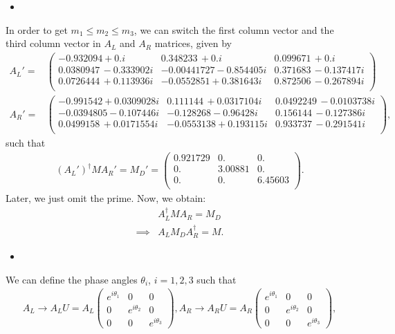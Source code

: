 \begin{itemize}
    \item [(b)]
\end{itemize}
In order to get $m_1\leq m_2\leq m_3$, we can switch the first column vector and the third column vector in $A_L$ and $A_R$ matrices, given by 
\begin{align}
    A_L'=&\begin{pmatrix}
         -0.932094+0. i & 0.348233\, +0. i & 0.099671\, +0. i \\
 0.0380947\, -0.333902 i & -0.00441727-0.854405 i & 0.371683\, -0.137417 i \\
 0.0726444\, +0.113936 i & -0.0552851+0.381643 i & 0.872506\, -0.267894 i \\
    \end{pmatrix}\\
A_R'=&\begin{pmatrix}
     -0.991542+0.0309028 i & 0.111144\, +0.0317104 i & 0.0492249\, -0.0103738 i \\
 -0.0394805-0.107446 i & -0.128268-0.96428 i & 0.156144\, -0.127386 i \\
 0.0499158\, +0.0171554 i & -0.0553138+0.193115 i & 0.933737\, -0.291541 i \\
\end{pmatrix},
\end{align}
such that 
\begin{align}
    (A_L')^\dagger M A_R' =  M_D'=\begin{pmatrix}
        0.921729 & 0. & 0. \\
        0. & 3.00881 & 0. \\
        0. & 0. & 6.45603 \\
    \end{pmatrix}.
\end{align}
Later, we just omit the prime. Now, we obtain:
\begin{align}
    &A_L^\dagger M A_R =  M_D\\
    \implies &A_L M_D A_R^\dagger =M.
\end{align}
\begin{itemize}
    \item [(c)]
\end{itemize}
We can define the phase angles $\theta_i$, $i=1,2,3$ such that 
\begin{align}
    A_L\to A_L U = A_L \begin{pmatrix}
        e^{i\theta_1} &0&0\\
        0&e^{i\theta_2}&0\\
        0&0&e^{i\theta_3}
    \end{pmatrix},
    A_R\to A_R U = A_R \begin{pmatrix}
        e^{i\theta_1} &0&0\\
        0&e^{i\theta_2}&0\\
        0&0&e^{i\theta_3}
    \end{pmatrix},
\end{align} 

